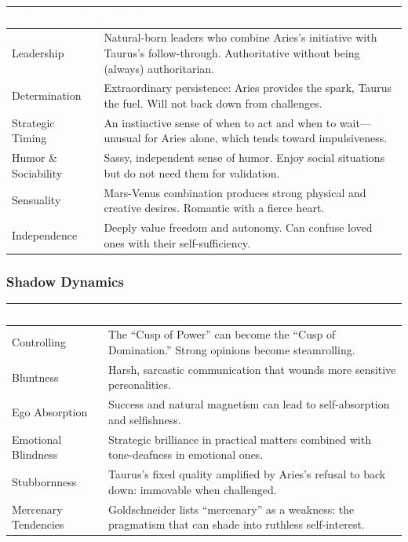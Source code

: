 \documentclass[11pt,letterpaper]{article}
\newcommand{\tableheader}[1]{\textbf{\sffamily\textcolor{white}{#1}}}
\begin{document}
\begin{center}
\begin{tabularx}{\textwidth}{L{3.5cm}X}
\toprule
{}
\tableheader{Trait Domain} & \tableheader{Synthesis} \\
\midrule
Leadership & Natural-born leaders who combine Aries's initiative with Taurus's follow-through. Authoritative without being (always) authoritarian. \\
Determination & Extraordinary persistence: Aries provides the spark, Taurus the fuel. Will not back down from challenges. \\
Strategic Timing & An instinctive sense of when to act and when to wait---unusual for Aries alone, which tends toward impulsiveness. \\
Humor \& Sociability & Sassy, independent sense of humor. Enjoy social situations but do not need them for validation. \\
Sensuality & Mars-Venus combination produces strong physical and creative desires. Romantic with a fierce heart. \\
Independence & Deeply value freedom and autonomy. Can confuse loved ones with their self-sufficiency. \\
\bottomrule
\end{tabularx}
\end{center}

\subsubsection{Shadow Dynamics}

\begin{center}
\begin{tabularx}{\textwidth}{L{3.5cm}X}
\toprule
{}
\tableheader{Shadow Trait} & \tableheader{Description} \\
\midrule
Controlling & The ``Cusp of Power'' can become the ``Cusp of Domination.'' Strong opinions become steamrolling. \\
Bluntness & Harsh, sarcastic communication that wounds more sensitive personalities. \\
Ego Absorption & Success and natural magnetism can lead to self-absorption and selfishness. \\
Emotional Blindness & Strategic brilliance in practical matters combined with tone-deafness in emotional ones. \\
Stubbornness & Taurus's fixed quality amplified by Aries's refusal to back down: immovable when challenged. \\
Mercenary Tendencies & Goldschneider lists ``mercenary'' as a weakness: the pragmatism that can shade into ruthless self-interest. \\
\bottomrule
\end{tabularx}
\end{center}
\end{document}
